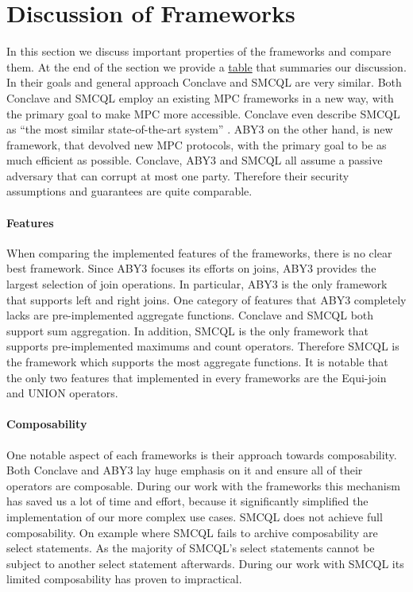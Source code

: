 \section{Discussion of Frameworks}
In this section we discuss important properties of the frameworks and compare them. 
At the end of the section we provide a \hyperref[Summary]{table} that summaries our discussion.
In their goals and general approach Conclave and SMCQL are very similar. Both Conclave and SMCQL employ an existing MPC frameworks in a new way, with the primary goal to make MPC more accessible. Conclave even describe SMCQL as ``the most similar state-of-the-art system'' \cite{10.1145/3302424.3303982}. ABY3 on the other hand, is new framework, that devolved new MPC protocols, with the primary goal to be as much efficient as possible. 
Conclave, ABY3 and SMCQL all assume a passive adversary that can corrupt at most one party. Therefore their security assumptions and guarantees are quite comparable. 
\paragraph{Features} 
When comparing the implemented features of the frameworks, there is no clear best framework. Since ABY3 focuses its efforts on joins, ABY3 provides the largest selection of join operations. In particular, ABY3 is the only framework that supports left and right joins. One category of features that ABY3 completely lacks are pre-implemented aggregate functions. Conclave and SMCQL both support sum aggregation. In addition, SMCQL is the only framework that supports pre-implemented maximums and count operators. Therefore SMCQL is the framework which supports the most aggregate functions. It is notable that the only two features that implemented in every frameworks are the Equi-join and UNION operators.  
\paragraph{Composability}
One notable aspect of each frameworks is their approach towards composability. Both Conclave and ABY3 lay huge emphasis on it and ensure all of their operators are composable. During our work with the frameworks this mechanism has saved us a lot of time and effort, because it significantly simplified the implementation of our more complex use cases.
SMCQL does not achieve full composability. On example where SMCQL fails to archive composability are select statements. As the majority of SMCQL's select statements cannot be subject to another select statement afterwards. During our work with SMCQL its limited composability has proven to impractical. 
